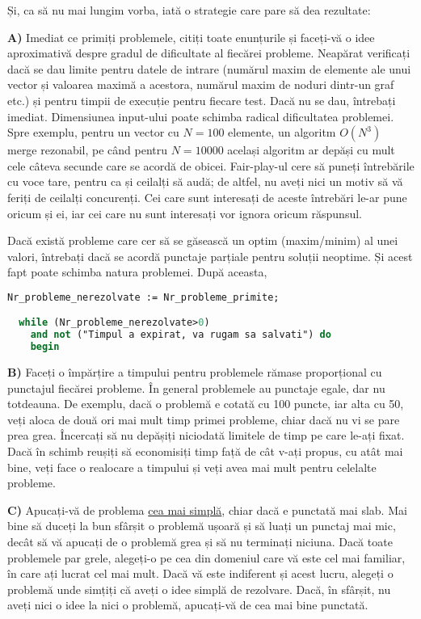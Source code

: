 Și, ca să nu mai lungim vorba, iată o strategie care pare să dea rezultate:

{\bf A)} Imediat ce primiți problemele, citiți toate enunțurile și faceți-vă o
idee aproximativă despre gradul de dificultate al fiecărei probleme. Neapărat
verificați dacă se dau limite pentru datele de intrare (numărul maxim de
elemente ale unui vector și valoarea maximă a acestora, numărul maxim de
noduri dintr-un graf etc.) și pentru timpii de execuție pentru fiecare
test. Dacă nu se dau, întrebați imediat. Dimensiunea input-ului poate schimba
radical dificultatea problemei. Spre exemplu, pentru un vector cu $N=100$
elemente, un algoritm $O(N^{3})$ merge rezonabil, pe când pentru $N=10000$
același algoritm ar depăși cu mult cele câteva secunde care se acordă de
obicei. Fair-play-ul cere să puneți întrebările cu voce tare, pentru ca și
ceilalți să audă; de altfel, nu aveți nici un motiv să vă feriți de ceilalți
concurenți. Cei care sunt interesați de aceste întrebări le-ar pune oricum și
ei, iar cei care nu sunt interesați vor ignora oricum răspunsul.

Dacă există probleme care cer să se găsească un optim (maxim/minim) al unei
valori, întrebați dacă se acordă punctaje parțiale pentru soluții neoptime. Și
acest fapt poate schimba natura problemei. După aceasta,

\begin{lstlisting}[frame=single, language=Pascal]
  Nr_probleme_nerezolvate := Nr_probleme_primite;

  while (Nr_probleme_nerezolvate>0) 
    and not ("Timpul a expirat, va rugam sa salvati") do
    begin
\end{lstlisting}

{\bf B)} Faceți o împărțire a timpului pentru problemele rămase proporțional
cu punctajul fiecărei probleme. În general problemele au punctaje egale, dar
nu totdeauna. De exemplu, dacă o problemă e cotată cu 100 puncte, iar alta cu
50, veți aloca de două ori mai mult timp primei probleme, chiar dacă nu vi se
pare prea grea. Încercați să nu depășiți niciodată limitele de timp pe care
le-ați fixat. Dacă în schimb reușiți să economisiți timp față de cât v-ați
propus, cu atât mai bine, veți face o realocare a timpului și veți avea mai
mult pentru celelalte probleme.

{\bf C)} Apucați-vă de problema \underline{cea mai simplă}, chiar dacă e
punctată mai slab. Mai bine să duceți la bun sfârșit o problemă ușoară și să
luați un punctaj mai mic, decât să vă apucați de o problemă grea și să nu
terminați niciuna. Dacă toate problemele par grele, alegeți-o pe cea din
domeniul care vă este cel mai familiar, în care ați lucrat cel mai mult. Dacă
vă este indiferent și acest lucru, alegeți o problemă unde simțiți că aveți o
idee simplă de rezolvare. Dacă, în sfârșit, nu aveți nici o idee la nici o
problemă, apucați-vă de cea mai bine punctată.

